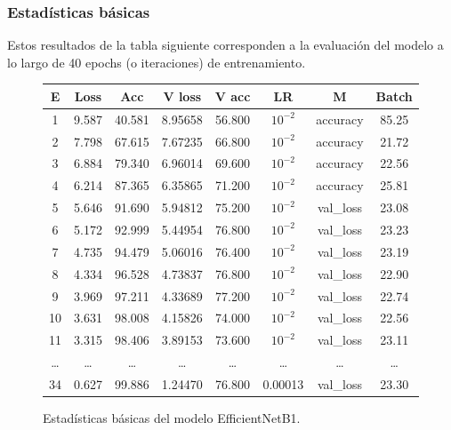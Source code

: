 	\subsubsection{Estadísticas básicas}\label{sub:basic_statistics_p1}
    
    Estos resultados de la tabla siguiente corresponden a la evaluación del modelo a lo largo de 40 epochs (o iteraciones) de entrenamiento.

    \begin{figure}[ht]
      \small
      \begin{center}
          \begin{tabular}{|c|c|c|c|c|c|c|c|} \hline
          E & Loss & Acc & V loss & V acc & LR & M & Batch \\ \hline
          1 & 9.587 & 40.581 & 8.95658 & 56.800 & $10^{-2}$ & accuracy & 85.25 \\ \hline
          2 & 7.798 & 67.615 & 7.67235 & 66.800 & $10^{-2}$ & accuracy & 21.72 \\ \hline
          3 & 6.884 & 79.340 & 6.96014 & 69.600 & $10^{-2}$ & accuracy & 22.56 \\ \hline
          4 & 6.214 & 87.365 & 6.35865 & 71.200 & $10^{-2}$ & accuracy & 25.81 \\ \hline
          5 & 5.646 & 91.690 & 5.94812 & 75.200 & $10^{-2}$ & val\_loss & 23.08 \\ \hline
          6 & 5.172 & 92.999 & 5.44954 & 76.800 & $10^{-2}$ & val\_loss & 23.23 \\ \hline
          7 & 4.735 & 94.479 & 5.06016 & 76.400 & $10^{-2}$ & val\_loss & 23.19 \\ \hline
          8 & 4.334 & 96.528 & 4.73837 & 76.800 & $10^{-2}$ & val\_loss & 22.90 \\ \hline
          9 & 3.969 & 97.211 & 4.33689 & 77.200 & $10^{-2}$ & val\_loss & 22.74 \\ \hline
          10 & 3.631 & 98.008 & 4.15826 & 74.000 & $10^{-2}$ & val\_loss & 22.56 \\ \hline
          11 & 3.315 & 98.406 & 3.89153 & 73.600 & $10^{-2}$ & val\_loss & 23.11 \\ \hline
          \dots & \dots & \dots & \dots & \dots & \dots & \dots & \dots \\ \hline
          34 & 0.627 & 99.886 & 1.24470 & 76.800 & 0.00013 & val\_loss & 23.30 \\ \hline
          \end{tabular}
          \caption{Estadísticas básicas del modelo EfficientNetB1.}
      \end{center}\label{fig:estadisticas_p1}
  \end{figure}
    

